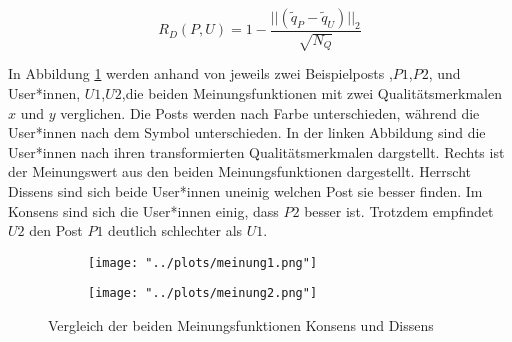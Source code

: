 \begin{equation}
\label{dissens}
R_D(P,U) = 1 - \frac{||(\tilde{q}_P - \tilde{q}_U)||_2}{\sqrt{N_Q}}
\end{equation}

In Abbildung \ref{fig:vergleichmeinung} werden anhand von jeweils zwei Beispielposts ,$P1$,$P2$, und User*innen, $U1$,$U2$,die beiden Meinungsfunktionen mit zwei Qualitätsmerkmalen $x$ und $y$ verglichen. Die Posts werden nach Farbe unterschieden, während die User*innen nach dem Symbol unterschieden. In der linken Abbildung sind die User*innen nach ihren transformierten Qualitätsmerkmalen dargstellt. Rechts ist der Meinungswert aus den beiden Meinungsfunktionen dargestellt. Herrscht Dissens sind sich beide User*innen uneinig welchen Post sie besser finden. Im Konsens sind sich die User*innen einig, dass $P2$ besser ist. Trotzdem empfindet $U2$ den Post $P1$ deutlich schlechter als $U1$.

\begin{figure}
	\begin{subfigure}{0.6\textwidth}
		\texttt{[image: "../plots/meinung1.png"]}
	\end{subfigure}
	\begin{subfigure}{0.4\textwidth}
		\texttt{[image: "../plots/meinung2.png"]}
	\end{subfigure}
	\label{fig:vergleichmeinung}
	\caption{Vergleich der beiden Meinungsfunktionen Konsens und Dissens}
\end{figure}



